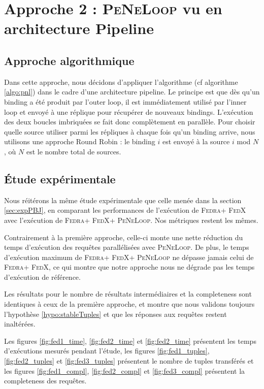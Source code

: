 \documentclass[a4paper]{article}
\def\fedra{\textsc{Fedra}\xspace}
\def\fedx{\textsc{FedX}\xspace}
\def\peneloop{\textsc{PeNeLoop}\xspace}
\begin{document}
\section{Approche 2 : \peneloop vu en architecture Pipeline}

\subsection{Approche algorithmique}

Dans cette approche, nous décidons d'appliquer l'algorithme (cf algorithme \ref{algo:pnl}) dans le cadre d'une architecture pipeline. Le principe est que dès qu'un binding a été produit par l'outer loop, il est immédiatement utilisé par l'inner loop et envoyé à une réplique pour récupérer de nouveaux bindings. L'exécution des deux boucles imbriquées se fait donc complètement en parallèle. Pour choisir quelle source utiliser parmi les répliques à chaque fois qu'un binding arrive, nous utilisons une approche Round Robin : le binding $i$ est envoyé à la source $i$ mod $N$, où $N$ est le nombre total de sources.



\subsection{Étude expérimentale}

Nous réitérons la même étude expérimentale que celle menée dans la section \ref{sec:expPBJ}, en comparant les performances de l'exécution de \fedra + \fedx avec l'exécution de \fedra + \fedx + \peneloop. Nos métriques restent les mêmes.

Contrairement à la première approche, celle-ci monte une nette réduction du temps d'exécution des requêtes parallélisées avec \peneloop. De plus, le temps d'exécution maximum de \fedra + \fedx + \peneloop ne dépasse jamais celui de \fedra + \fedx, ce qui montre que notre approche nous ne dégrade pas les temps d'exécution de référence.

Les résultats pour le nombre de résultats intermédiaires et la completeness sont identiques à ceux de la première approche, et montre que nous validons toujours l'hypothèse \ref{hypo:stableTuples} et que les réponses aux requêtes restent inaltérées.

Les figures \ref{fig:fed1_time}, \ref{fig:fed2_time} et \ref{fig:fed2_time} présentent les temps d'exécutions mesurés pendant l'étude, les figures \ref{fig:fed1_tuples}, \ref{fig:fed2_tuples} et \ref{fig:fed3_tuples} présentent le nombre de tuples transférés et les figures \ref{fig:fed1_compl}, \ref{fig:fed2_compl} et \ref{fig:fed3_compl} présentent la completeness des requêtes.
\end{document}
